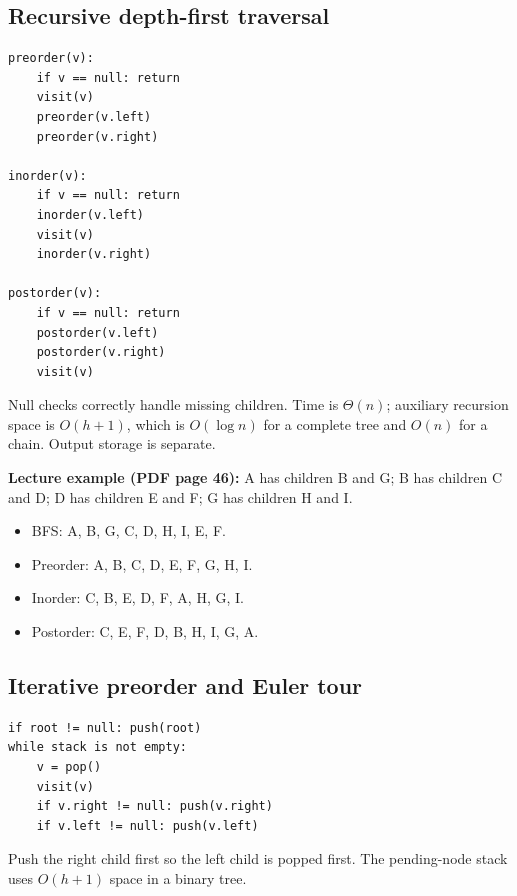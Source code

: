 \documentclass[11pt,letterpaper]{article}
\begin{document}
\subsection{Recursive depth-first traversal}
\par\noindent\begin{minipage}{\linewidth}
\begin{lstlisting}
preorder(v):
    if v == null: return
    visit(v)
    preorder(v.left)
    preorder(v.right)

inorder(v):
    if v == null: return
    inorder(v.left)
    visit(v)
    inorder(v.right)

postorder(v):
    if v == null: return
    postorder(v.left)
    postorder(v.right)
    visit(v)
\end{lstlisting}
\end{minipage}\par
Null checks correctly handle missing children. Time is $\Theta(n)$; auxiliary recursion space is $O(h+1)$, which is $O(\log n)$ for a complete tree and $O(n)$ for a chain. Output storage is separate.

\textbf{Lecture example (PDF page 46):} A has children B and G; B has children C and D; D has children E and F; G has children H and I.
\begin{itemize}
\item BFS: A, B, G, C, D, H, I, E, F.
\item Preorder: A, B, C, D, E, F, G, H, I.
\item Inorder: C, B, E, D, F, A, H, G, I.
\item Postorder: C, E, F, D, B, H, I, G, A.
\end{itemize}

\subsection{Iterative preorder and Euler tour}
\par\noindent\begin{minipage}{\linewidth}
\begin{lstlisting}
if root != null: push(root)
while stack is not empty:
    v = pop()
    visit(v)
    if v.right != null: push(v.right)
    if v.left != null: push(v.left)
\end{lstlisting}
\end{minipage}\par
Push the right child first so the left child is popped first. The pending-node stack uses $O(h+1)$ space in a binary tree.
\end{document}
